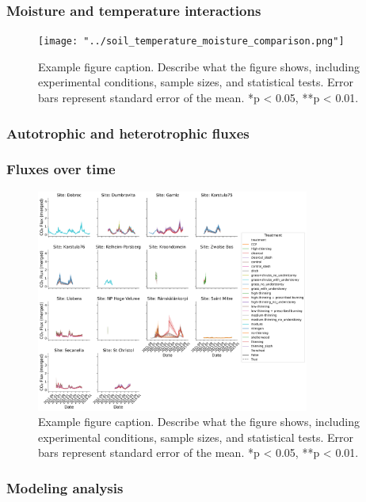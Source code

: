 \documentclass[12pt,a4paper]{article}
\begin{document}
\subsubsection{Moisture and temperature interactions}
\begin{figure}[H]
    \centering
    \texttt{[image: "../soil\_temperature\_moisture\_comparison.png"]}
    \caption{Example figure caption. Describe what the figure shows, including experimental conditions, sample sizes, and statistical tests. Error bars represent standard error of the mean. *p < 0.05, **p < 0.01.}
    \label{fig:temp_moisture}
\end{figure}


\subsubsection{Autotrophic and heterotrophic fluxes}

\subsubsection{Fluxes over time}
\begin{figure}[H]
    \centering
    \includegraphics[width=0.8\textwidth]{"../co2_flux_timeseries.png"}
    \caption{Example figure caption. Describe what the figure shows, including experimental conditions, sample sizes, and statistical tests. Error bars represent standard error of the mean. *p < 0.05, **p < 0.01.}
    \label{fig:timeseries}
\end{figure}




\subsubsection{Modeling analysis}
\end{document}
